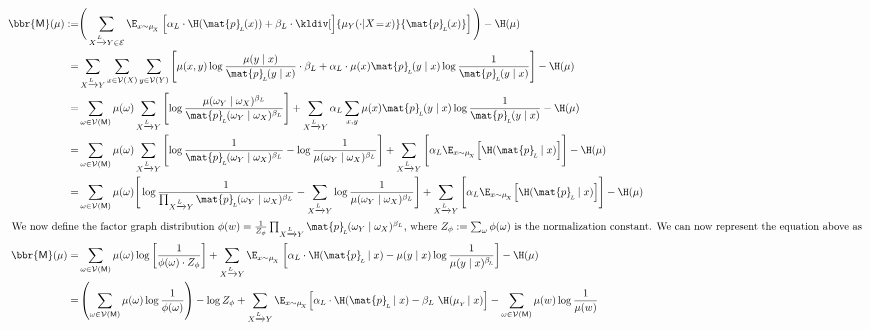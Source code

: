\documentclass{article}
\newcommand{\bp}[1][L]{\mat{p}_{\!_#1\!}}
\newcommand{\V}{\mathcal V}
\newcommand{\Ed}{\mathcal E}
\newcommand{\sfM}{\mathsf M}
\newcommand{\alle}[1][L]{_{ X \xrightarrow{\!\!#1} Y }}
\begin{document}
	\begin{align*}
		\bbr{\sfM}(\mu) :=& \Bigg(\sum_{ X \xrightarrow{\!\!L} Y  \in \Ed } \E_{x \sim \mu_{\!_X}}  \left[ \alpha_L\cdot \H (\bp (x)) + \beta_L \cdot \kldiv[\Big]{ \mu_Y(\cdot | X \!=\! x) }{\bp(x) }  \right] \Bigg) - \H(\mu) \\
		=& \sum_{ X \xrightarrow{\!\!L} Y } \sum_{x \in \V(X)} \sum_{y \in \V(Y)}  \left[
			\mu(x,y) \log \frac{\mu(y \mid x)}{\bp(y \mid x)}\cdot \beta_L 
			+ \alpha_L \cdot \mu(x) \bp(y \mid x) \log \frac{1}{\bp(y \mid x)} \right]  - \H(\mu) \\
%
%
		=& \sum_{\omega \in \V(\sfM)} \mu(\omega) \sum\alle \left[
			\log \frac{\mu(\omega_Y \mid \omega_X)^{\beta_L}}{\bp(\omega_Y \mid \omega_X)^{\beta_L}} 
			\right] + \sum\alle \alpha_L \sum_{x,y} \mu(x) \bp(y \mid x) \log \frac{1}{\bp(y \mid x)}   - \H(\mu) \\
%
		=& \sum_{\omega \in \V(\sfM)} \mu(\omega) \sum\alle \left[
			\log \frac{1}{\bp(\omega_Y \mid \omega_X)^{\beta_L} } - \log \frac{1}{\mu(\omega_Y \mid \omega_X)^{\beta_L}}
			\right] + \sum\alle \Bigg[\alpha_L \E_{x \sim \mu_{\!_X}} \Big[ \H(\bp \mid x) \Big] \Bigg]- \H(\mu) \\
%
		=& \sum_{\omega \in \V(\sfM)} \mu(\omega) \Bigg[
			\log \frac{1}{\prod\alle\bp(\omega_Y \mid \omega_X)^{\beta_L} } - \sum\alle \log \frac{1}{\mu(\omega_Y \mid \omega_X)^{\beta_L}}
			\Bigg] + \sum\alle \Bigg[\alpha_L \E_{x \sim \mu_{\!_X}} \Big[ \H(\bp \mid x) \Big] \Bigg]- \H(\mu) \\
%
	\intertext{
	We now define the factor graph distribution $\phi(w) = \frac{1}{Z_{\phi}}\prod\alle \bp(\omega_Y \mid \omega_X)^{\beta_L}$, where $Z_\phi := \sum_{\omega} \phi(\omega)$ is the normalization constant. We can now represent the equation above as }
%
		\bbr{\sfM}(\mu) =& \sum_{\omega \in \V(\sfM)} \mu(\omega) \log \left[
			\frac{1}{\phi(\omega) \cdot Z_\phi} 
			\right] + \sum\alle \E_{x \sim \mu_{\!_X}} \left[ \alpha_L \cdot \H(\bp \mid x) - \mu(y \mid x) \log \frac{1}{\mu(y \mid x)^{\beta_{\!_L}\!}} \right]  - \H(\mu) \\
%
		=& \left(\sum_{\omega \in \V(\sfM)} \mu(\omega) \log \frac{1}{\phi(\omega) }\right) - \log Z_\phi + 
			\sum\alle \E_{x \sim \mu_{\!_X}} \Big[ \alpha_L \cdot \H(\bp \mid x) - \beta_L \ \H(\mu_{_Y}\! \mid x) \Big] -\sum_{\omega \in \V(\sfM)} \mu(w) \log \frac{1}{\mu(w)}  \\

\end{align*}
\end{document}
